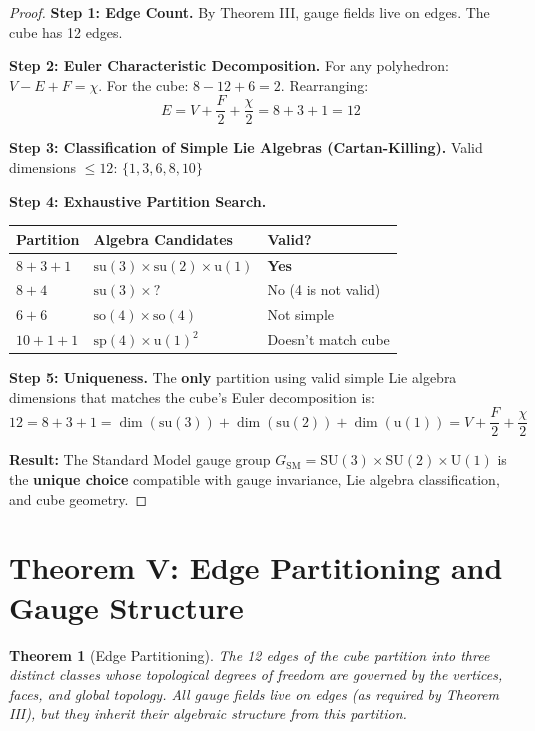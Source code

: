 \documentclass[11pt,a4paper]{article}
\theoremstyle{plain}
\newtheorem{theorem}{Theorem}[section]
\theoremstyle{definition}
\theoremstyle{remark}
\newcommand{\SUthree}{\text{SU}(3)}
\newcommand{\SUtwo}{\text{SU}(2)}
\newcommand{\Uone}{\text{U}(1)}
\newcommand{\GSM}{G_{\text{SM}}}
\begin{document}
\begin{proof}
\textbf{Step 1: Edge Count.} By Theorem III, gauge fields live on edges. The cube has 12 edges.

\textbf{Step 2: Euler Characteristic Decomposition.} For any polyhedron: $V - E + F = \chi$. For the cube: $8 - 12 + 6 = 2$. Rearranging:
\[
\boxed{E = V + \frac{F}{2} + \frac{\chi}{2} = 8 + 3 + 1 = 12}
\]

\textbf{Step 3: Classification of Simple Lie Algebras (Cartan-Killing).} Valid dimensions $\leq 12$: $\{1, 3, 6, 8, 10\}$

\textbf{Step 4: Exhaustive Partition Search.}

\begin{center}
\begin{tabular}{lll}
\toprule
\textbf{Partition} & \textbf{Algebra Candidates} & \textbf{Valid?} \\
\midrule
$8 + 3 + 1$ & $\text{su}(3) \times \text{su}(2) \times \text{u}(1)$ & \textbf{Yes} \\
$8 + 4$ & $\text{su}(3) \times ?$ & No (4 is not valid) \\
$6 + 6$ & $\text{so}(4) \times \text{so}(4)$ & Not simple \\
$10 + 1 + 1$ & $\text{sp}(4) \times \text{u}(1)^2$ & Doesn't match cube \\
\bottomrule
\end{tabular}
\end{center}

\textbf{Step 5: Uniqueness.} The \textbf{only} partition using valid simple Lie algebra dimensions that matches the cube's Euler decomposition is:
\[
12 = 8 + 3 + 1 = \dim(\text{su}(3)) + \dim(\text{su}(2)) + \dim(\text{u}(1)) = V + \frac{F}{2} + \frac{\chi}{2}
\]

\textbf{Result:} The Standard Model gauge group $\GSM = \SUthree \times \SUtwo \times \Uone$ is the \textbf{unique choice} compatible with gauge invariance, Lie algebra classification, and cube geometry.
\end{proof}

\section{Theorem V: Edge Partitioning and Gauge Structure}

\begin{theorem}[Edge Partitioning]
The 12 edges of the cube partition into three distinct classes whose topological degrees of freedom are governed by the vertices, faces, and global topology. All gauge fields live on edges (as required by Theorem III), but they inherit their algebraic structure from this partition.
\end{theorem}
\end{document}
